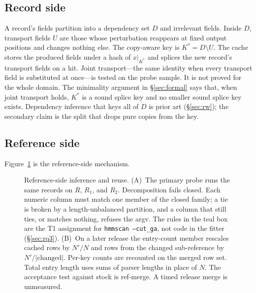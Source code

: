 \documentclass[letterpaper,twocolumn,10pt]{article}
\begin{document}
\subsection{Record side}
\label{sec:record}

A record's fields partition into a dependency set $D$ and irrelevant fields.
Inside $D$, transport fields $U$ are those whose perturbation reappears at fixed output positions and changes nothing else.
The copy-aware key is $K^{\ast} = D \setminus U$.
The cache stores the produced fields under a hash of $x|_{K^{\ast}}$ and splices the new record's transport fields on a hit.
Joint transport---the same identity when every transport field is substituted at once---is tested on the probe sample.
It is not proved for the whole domain.
The minimality argument in \S\ref{sec:formal} says that, when joint transport holds, $K^{\ast}$ is a sound splice key and no smaller sound splice key exists.
Dependency inference that keys all of $D$ is prior art (\S\ref{sec:rw}); the secondary claim is the split that drops pure copies from the key.

\subsection{Reference side}
\label{sec:reference}

Figure~\ref{fig:refmech} is the reference-side mechanism.

\begin{figure}[t]
\centering

\caption{Reference-side inference and reuse.
(A)~The primary probe runs the same records on $R$, $R_1$, and $R_2$.
Decomposition fails closed.
Each numeric column must match one member of the closed family; a tie is broken by a length-unbalanced partition, and a column that still ties, or matches nothing, refuses the argv.
The rules in the teal box are the T1 assignment for \texttt{hmmscan --cut\_ga}, not code in the fitter (\S\ref{sec:rq3}).
(B)~On a later release the entry-count member rescales cached rows by $N'/N$ and rows from the changed sub-reference by $N'/|\mathrm{changed}|$.
Per-key counts are recounted on the merged row set.
Total entry length uses sums of parser lengths in place of $N$.
The acceptance test against stock is ref-merge.
A timed release merge is unmeasured.}
\label{fig:refmech}
\end{figure}
\end{document}

